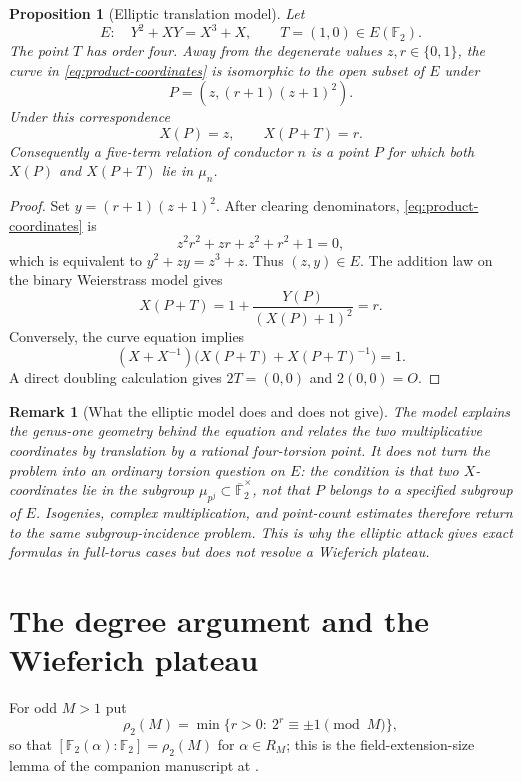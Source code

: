 \documentclass[a4paper]{article}
\newtheorem{proposition}[theorem]{Proposition}
\newtheorem{remark}[theorem]{Remark}
\newcommand{\F}{\mathbb{F}}
\begin{document}
\begin{proposition}[Elliptic translation model]\label{prop:elliptic-translation}
	Let
	\[
		E:\quad Y^2+XY=X^3+X,\qquad T=(1,0)\in E(\F_2).
	\]
	The point $T$ has order four.  Away from the degenerate values
	$z,r\in\{0,1\}$, the curve in \eqref{eq:product-coordinates} is
	isomorphic to the open subset of $E$ under
	\[
		P=\left(z,(r+1)(z+1)^2\right).
	\]
	Under this correspondence
	\[
		X(P)=z,\qquad X(P+T)=r.
	\]
	Consequently a five-term relation of conductor $n$ is a point $P$ for
	which both $X(P)$ and $X(P+T)$ lie in $\mu_n$.
\end{proposition}

\begin{proof}
	Set $y=(r+1)(z+1)^2$.  After clearing denominators,
	\eqref{eq:product-coordinates} is
	\[
		z^2r^2+zr+z^2+r^2+1=0,
	\]
	which is equivalent to
	$y^2+zy=z^3+z$.  Thus $(z,y)\in E$.
	The addition law on the binary Weierstrass model gives
	\[
		X(P+T)=1+\frac{Y(P)}{(X(P)+1)^2}=r.
	\]
	Conversely, the curve equation implies
	\[
		(X+X^{-1})\bigl(X(P+T)+X(P+T)^{-1}\bigr)=1.
	\]
	A direct doubling calculation gives $2T=(0,0)$ and $2(0,0)=O$.
\end{proof}

\begin{remark}[What the elliptic model does and does not give]
	The model explains the genus-one geometry behind the equation and
	relates the two multiplicative coordinates by translation by a rational
	four-torsion point.  It does not turn the problem into an ordinary
	torsion question on $E$: the condition is that two \emph{$X$-coordinates}
	lie in the subgroup $\mu_{p^j}\subset\overline{\F}_2^\times$, not that
	$P$ belongs to a specified subgroup of $E$.  Isogenies, complex
	multiplication, and point-count estimates therefore return to the same
	subgroup-incidence problem.  This is why the elliptic attack gives
	exact formulas in full-torus cases but does not resolve a Wieferich
	plateau.
\end{remark}

\section{The degree argument and the Wieferich plateau}\label{sec:degree}

For odd $M>1$ put
\[
	\rho_2(M)=\min\{r>0:\ 2^{r}\equiv\pm1\pmod M\},
\]
so that $[\F_2(\alpha):\F_2]=\rho_2(M)$ for $\alpha\in R_M$; this is the
field-extension-size lemma of the companion manuscript at
.
\end{document}
